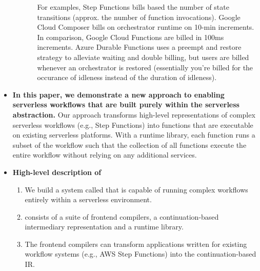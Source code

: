 \begin{itemize}
\begin{enumerate}
\begin{enumerate}
          For examples, Step Functions bills based the number of state
          transitions (approx. the number of function invocations). Google
          Cloud Composer bills on orchestrator runtime on 10-min increments.
          In comparison, Google Cloud Functions are billed in 100ms
          increments. Azure Durable Functions uses a preempt and restore
          strategy to alleviate waiting and double billing, but users are
          billed whenever an orchestrator is restored (essentially you're
          billed for the occurance of idleness instead of the duration of
          idleness).

        \end{enumerate}

    \end{enumerate}



  \item \textbf{In this paper, we demonstrate a new approach to enabling
  serverless workflows that are built purely within the serverless
  abstraction.} Our approach transforms high-level representations of complex
  serverless workflows (e.g., Step Functions) into functions that are
  executable on existing serverless platforms. With a runtime library, each
  function runs a subset of the workflow such that the collection of all
  functions execute the entire workflow without relying on any additional
  services.

  \item \textbf{High-level description of \name{}}

    \begin{enumerate}

      \item We build a system called \name{} that is capable of running
      complex workflows entirely within a serverless environment.

      \item \name{} consists of a suite of frontend compilers, a
      continuation-based intermediary representation and a runtime library.

      \item The frontend compilers can transform applications written for
      existing workflow systems (e.g., AWS Step Functions) into the
      continuation-based
      \name{} IR.


\end{enumerate}
\end{itemize}
